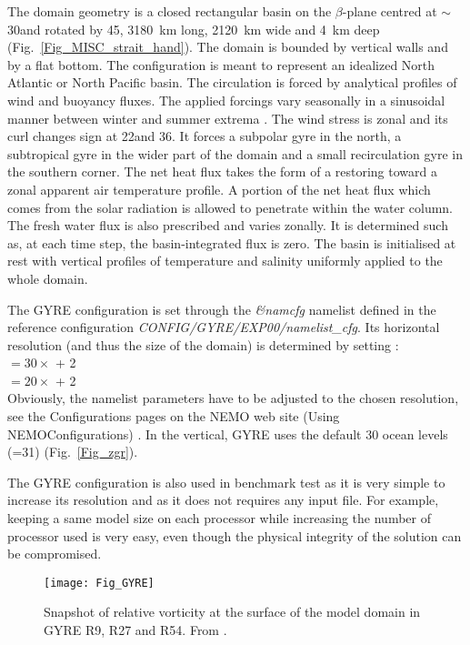 \documentclass[NEMO_book]{subfiles}
\begin{document}
The domain geometry is a closed rectangular basin on the $\beta$-plane centred 
at $\sim$ 30\degN and rotated by 45\deg, 3180~km long, 2120~km wide 
and 4~km deep (Fig.~\ref{Fig_MISC_strait_hand}). 
The domain is bounded by vertical walls and by a flat bottom. The configuration is 
meant to represent an idealized North Atlantic or North Pacific basin. 
The circulation is forced by analytical profiles of wind and buoyancy fluxes. 
The applied forcings vary seasonally in a sinusoidal manner between winter 
and summer extrema \citep{Levy_al_OM10}. 
The wind stress is zonal and its curl changes sign at 22\degN and 36\degN. 
It forces a subpolar gyre in the north, a subtropical gyre in the wider part of the domain 
and a small recirculation gyre in the southern corner. 
The net heat flux takes the form of a restoring toward a zonal apparent air 
temperature profile. A portion of the net heat flux which comes from the solar radiation
is allowed to penetrate within the water column. 
The fresh water flux is also prescribed and varies zonally. 
It is determined such as, at each time step, the basin-integrated flux is zero. 
The basin is initialised at rest with vertical profiles of temperature and salinity 
uniformly applied to the whole domain.

The GYRE configuration is set through the \textit{\&namcfg} namelist defined in the reference 
configuration \textit{CONFIG/GYRE/EXP00/namelist\_cfg}. Its horizontal resolution 
(and thus the size of the domain) is determined by setting  : \\
 $= 30 \times$  + 2   \\
 $= 20 \times$  + 2   \\
Obviously, the namelist parameters have to be adjusted to the chosen resolution, see the Configurations 
pages on the NEMO web site (Using NEMO\/Configurations) .
In the vertical, GYRE uses the default 30 ocean levels (=31) (Fig.~\ref{Fig_zgr}).

The GYRE configuration is also used in benchmark test as it is very simple to increase 
its resolution and as it does not requires any input file. For example, keeping a same model size 
on each processor while increasing the number of processor used is very easy, even though the 
physical integrity of the solution can be compromised.

\begin{figure}[!t]   \begin{center}
\texttt{[image: Fig\_GYRE]}
\caption{  \label{Fig_GYRE}   
Snapshot of relative vorticity at the surface of the model domain 
in GYRE R9, R27 and R54. From \citet{Levy_al_OM10}.}
\end{center}   \end{figure}
\end{document}
